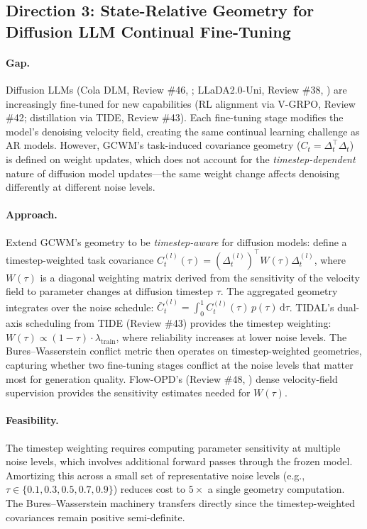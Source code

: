 \documentclass[11pt]{article}
\begin{document}
\subsection{Direction 3: State-Relative Geometry for Diffusion LLM Continual Fine-Tuning}

\paragraph{Gap.}
Diffusion LLMs (Cola DLM, Review \#46, \cite{coladlm}; LLaDA2.0-Uni, Review \#38, \cite{llada2uni}) are increasingly fine-tuned for new capabilities (RL alignment via V-GRPO, Review \#42; distillation via TIDE, Review \#43). Each fine-tuning stage modifies the model's denoising velocity field, creating the same continual learning challenge as AR models. However, GCWM's task-induced covariance geometry ($C_t = \Delta_t^\top \Delta_t$) is defined on weight updates, which does not account for the \emph{timestep-dependent} nature of diffusion model updates---the same weight change affects denoising differently at different noise levels.

\paragraph{Approach.}
Extend GCWM's geometry to be \emph{timestep-aware} for diffusion models: define a timestep-weighted task covariance $C_t^{(l)}(\tau) = (\Delta_t^{(l)})^\top W(\tau) \Delta_t^{(l)}$, where $W(\tau)$ is a diagonal weighting matrix derived from the sensitivity of the velocity field to parameter changes at diffusion timestep $\tau$. The aggregated geometry integrates over the noise schedule: $\bar{C}_t^{(l)} = \int_0^1 C_t^{(l)}(\tau)\, p(\tau)\, \mathrm{d}\tau$. TIDAL's dual-axis scheduling from TIDE (Review \#43) provides the timestep weighting: $W(\tau) \propto (1 - \tau) \cdot \lambda_{\mathrm{train}}$, where reliability increases at lower noise levels. The Bures--Wasserstein conflict metric then operates on timestep-weighted geometries, capturing whether two fine-tuning stages conflict at the noise levels that matter most for generation quality. Flow-OPD's (Review \#48, \cite{flowopd}) dense velocity-field supervision provides the sensitivity estimates needed for $W(\tau)$.

\paragraph{Feasibility.}
The timestep weighting requires computing parameter sensitivity at multiple noise levels, which involves additional forward passes through the frozen model. Amortizing this across a small set of representative noise levels (e.g., $\tau \in \{0.1, 0.3, 0.5, 0.7, 0.9\}$) reduces cost to $5\times$ a single geometry computation. The Bures--Wasserstein machinery transfers directly since the timestep-weighted covariances remain positive semi-definite.
\end{document}
